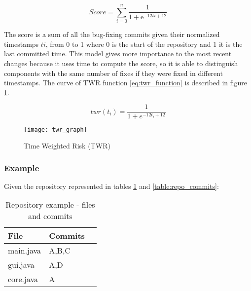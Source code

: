 \begin{equation}
 Score = \sum_{ i=0}^{n} \frac{1}{1 + \mathrm{e}^{-12ti + 12}}
\end{equation}

The score is a sum of all the bug-fixing commits given their normalized timestamps \( ti\), from 0 to 1 where 0 is the start of the repository and 1 it is the last committed time. This model gives more importance to the most recent changes because it uses time to compute the score, so it is able to distinguish components with the same number of fixes if they were fixed in different timestamps. The curve of TWR function \ref{eq:twr_function} is described in figure \ref{figure:twr_graph}.

\begin{equation}
\label{eq:twr_function}
twr(t_i) = \frac{1}{1 + e^{-12t_i + 12}}
\end{equation}

\begin{figure}[H]
    \begin{center}
        \texttt{[image: twr\_graph]}
        \caption{Time Weighted Risk (TWR)}
        \label{figure:twr_graph}
    \end{center}
\end{figure}

\subsubsection{Example}
Given the repository represented in tables \ref{table:repo_files_commits} and \ref{table:repo_commits}:

\begin{table}[H]
    \caption{Repository example -  files and commits}
    \label{table:repo_files_commits}
    \begin{center}
        \begin{tabular}{ | l | l | l | }
            \hline
            File & Commits \\ \hline
            main.java & A,B,C \\ \hline
            gui.java & A,D\\ \hline
            core.java & A  \\
            \hline
        \end{tabular}
    \end{center}
\end{table}

